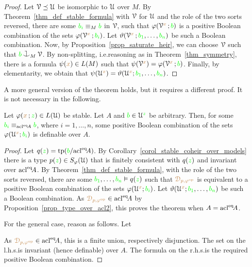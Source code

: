 \begin{proof}
  Let $\EuScript V\preceq\EuScript U$ be isomorphic to $\EuScript U$ over $M$.
  By Theorem~\ref{thm_def_stable_formula} with $\EuScript V$ for $\EuScript U$ and the role of the two sorts reversed, there are  some  ${\color{green} b_i}\equiv_M{\color{green} b}$ in $\EuScript V$, such that $\varphi(\EuScript V^{\color{brown} x}\,;{\color{green} b})$ is a positive Boolean combination of the sets $\varphi(\EuScript V^{\color{brown} x}\,;{\color{green} b_i})$.
  Let $\vartheta(\EuScript V^{\color{brown} x}\,;{\color{green} b_1},\dots,{\color{green} b_n})$ be such a Boolean combination.
  Now, by Proposition~\ref{prop_saturate_heir}, we can choose $\EuScript V$ such that ${\gr b}\cnonfork_M\V$.
  By non-splitting, i.e.\@ reasoning as in Theorem~\ref{thm_symmetry}, there is a formula $\psi({\color{brown} x})\in L(M)$ such that $\psi(\EuScript V^{\color{brown} x})=\varphi(\EuScript V^{\color{brown} x}\,;{\color{green} b})$.
  Finally, by elementarity, we obtain that $\psi(\EuScript U^{\color{brown} x})=\vartheta(\EuScript U^{\color{brown} x};{\color{green} b_1},\dots,{\color{green} b_n})$.
\end{proof}

A more general version of the theorem holds, but it requires a different proof.
It is not necessary in the following.

\begin{theorem}\label{thm_stability_definable_rovescio2}
  Let $\varphi({\color{brown} x}\,;{\color{green} z})\in L(\EuScript U)$ be stable.
  Let $A$ and ${\color{green} b}\in\EuScript U^{\color{green} z}$ be arbitrary.
  Then, for some ${\color{green} b_i}\equiv_{{\rm acl}^{{\rm eq}}\!A}{\color{green} b}$, where $i=1,\dots,n$, some positive Boolean combination of the sets $\varphi(\EuScript U^{\color{brown} x};{\color{green} b_i})$ is definable over $A$.
\end{theorem}

\begin{proof}
  Let $q({\color{green} z})={\rm tp}({\color{green} b}/{\rm acl}^{{\rm eq}}\!A)$.
  By Corollary~\ref{corol_stable_coheir_over_models} there is a type $p({\color{green} z})\in S_\varphi(\EuScript U)$ that is finitely consistent with $q({\color{green} z})$ and invariant over ${\rm acl}^{{\rm eq}}\!A$.
  By Theorem~\ref{thm_def_stable_formula}, with the role of the two sorts reversed, there are some ${\color{green} b_1},\dots,{\color{green} b_n}\vDash q({\color{green} z})$ such that ${\color{brown}\EuScript D_{p,\varphi^{\rm op}}}$ is equivalent to a positive Boolean combination of the sets $\varphi(\EuScript U^{\color{brown} x};{\color{green} b_i})$.
  Let $\vartheta(\EuScript U^{\color{brown} x};{\color{green} b_1},\dots,{\color{green} b_n})$ be such a Boolean combination.
  As ${\color{brown}\EuScript D_{p,\varphi^{\rm op}}}\in{\rm acl}^{{\rm eq}}\!A$ by Proposition~\ref{prop_type_over_acl2}, this proves the theorem when $A={\rm acl}^{{\rm eq}}\!A$.

  For the general case, reason as follows.
  Let 
  

  As ${\color{brown}\EuScript D_{p,\varphi^{\rm op}}}\in{\rm acl}^{{\rm eq}}\!A$, this is a finite union, respectively disjunction.
  The set on the l.h.s.\@ is invariant (hence definable) over $A$.
  The formula on the r.h.s.\@ is the required positive Boolean combination.
\end{proof}

